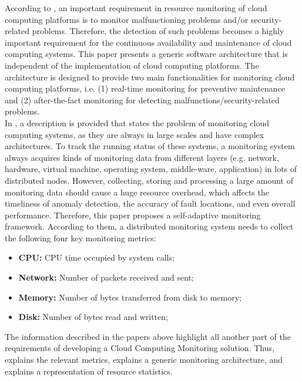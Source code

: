 \noindent
According to \cite{aktas2018hybrid}, an important requirement in resource monitoring of cloud computing platforms is to monitor malfunctioning problems and/or security-related problems. Therefore, the detection of such problems becomes a highly important requirement for the continuous availability and maintenance of cloud computing systems. This paper presents a generic software architecture that is independent of the implementation of cloud computing platforms. The architecture is designed to provide two main functionalities for monitoring cloud computing platforms, i.e. (1) real-time monitoring for preventive maintenance and (2) after-the-fact monitoring for detecting malfunctions/security-related problems.\\

\noindent
In \cite{wang2018self}, a description is provided that states the problem of monitoring cloud computing systems, as they are always in large scales and have complex architectures. To track the running status of these systems, a monitoring system always acquires kinds of monitoring data from different layers (e.g. network, hardware, virtual machine, operating system, middle-ware, application) in lots of distributed nodes. However, collecting, storing and processing a large amount of monitoring data should cause a huge resource overhead, which affects the timeliness of anomaly detection, the accuracy of fault locations, and even overall performance. Therefore, this paper proposes a self-adaptive monitoring framework. According to them, a distributed monitoring system needs to collect the following four key monitoring metrics:
\begin{itemize}
    \item \textbf{CPU: }CPU time occupied by system calls;
    \item \textbf{Network: }Number of packets received and sent;
    \item \textbf{Memory: }Number of bytes transferred from disk to memory;
    \item \textbf{Disk: }Number of bytes read and written;
\end{itemize}

\noindent
The information described in the papers above highlight all another part of the requirements of developing a Cloud Computing Monitoring solution. Thus, \cite{wang2018self} explains the relevant metrics, \cite{aktas2018hybrid} explains a generic monitoring architecture, and \cite{hauser2018reviewing} explains a representation of resource statistics.

